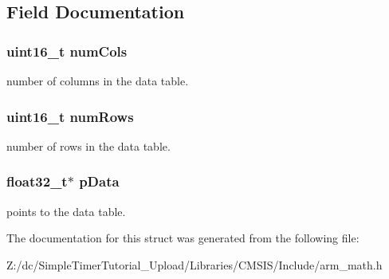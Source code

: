 \subsection{Field Documentation}
\hypertarget{structarm__bilinear__interp__instance__f32_a4bb5ec0d13eb4c9cf887aa8366a44117}{
\subsubsection[{num\-Cols}]{\setlength{\rightskip}{0pt plus 5cm}uint16\-\_\-t num\-Cols}}\label{structarm__bilinear__interp__instance__f32_a4bb5ec0d13eb4c9cf887aa8366a44117}
number of columns in the data table. \hypertarget{structarm__bilinear__interp__instance__f32_a1bcf80ccdc2acc29198f1592ae300390}{
\subsubsection[{num\-Rows}]{\setlength{\rightskip}{0pt plus 5cm}uint16\-\_\-t num\-Rows}}\label{structarm__bilinear__interp__instance__f32_a1bcf80ccdc2acc29198f1592ae300390}
number of rows in the data table. \hypertarget{structarm__bilinear__interp__instance__f32_af5c3a2f15c98850cdcfbe6f87e5ac5df}{
\subsubsection[{p\-Data}]{\setlength{\rightskip}{0pt plus 5cm}float32\-\_\-t$\ast$ p\-Data}}\label{structarm__bilinear__interp__instance__f32_af5c3a2f15c98850cdcfbe6f87e5ac5df}
points to the data table. 

The documentation for this struct was generated from the following file\-:\begin{DoxyCompactItemize}
\item 
Z\-:/dc/\-Simple\-Timer\-Tutorial\-\_\-\-Upload/\-Libraries/\-C\-M\-S\-I\-S/\-Include/arm\-\_\-math.\-h\end{DoxyCompactItemize}

